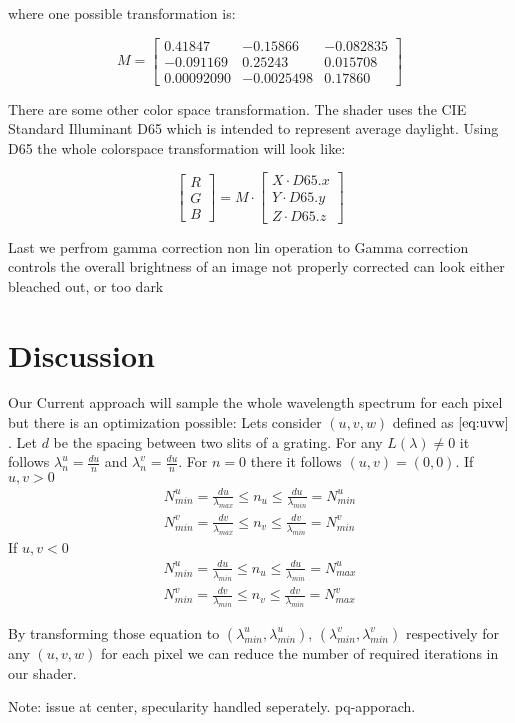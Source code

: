where one possible transformation is: 

\begin{equation}
M = \begin{bmatrix} 0.41847 & -0.15866 & -0.082835\\ -0.091169 & 0.25243 & 0.015708\\ 0.00092090 & -0.0025498 & 0.17860 \end{bmatrix}
\end{equation}

There are some other color space transformation. The shader uses the CIE Standard Illuminant D65 which is intended to represent average daylight. Using D65 the whole colorspace transformation will look like:

\begin{equation}
\begin{bmatrix}R\\G\\B\end{bmatrix} = M \cdot \begin{bmatrix}X \cdot D65.x \\ Y \cdot D65.y \\Z \cdot D65.z \end{bmatrix} 
\end{equation}

Last we perfrom gamma correction
non lin operation to 
Gamma correction controls the overall brightness of an image
not properly corrected can look either bleached out, or too dark

\section{Discussion}
Our Current approach will sample the whole wavelength spectrum for each pixel but there is an optimization possible:
Lets consider $(u,v,w)$ defined as $\ref{eq:uvw}$. Let $d$ be the spacing between two slits of a grating. For any $L(\lambda) \neq 0$ it follows $\lambda_{n}^{u} = \frac{d u}{n}$ and $\lambda_{n}^{v} = \frac{d u}{n}$. For $n = 0$ there it follows $(u,v)=(0,0)$. 
If $u,v > 0$
\begin{align*}
    N_{min}^{u} = \frac{d u}{\lambda_{max}} \leq n_{u} \leq \frac{d u}{\lambda_{min}} = N_{min}^{u}\\
    N_{min}^{v} = \frac{d v}{\lambda_{max}} \leq n_{v} \leq \frac{d v}{\lambda_{min}} = N_{min}^{v}
\end{align*}
If $u,v < 0$
\begin{align*}
    N_{min}^{u} = \frac{d u}{\lambda_{min}} \leq n_{u} \leq \frac{d u}{\lambda_{min}} = N_{max}^{u}\\
    N_{min}^{v} = \frac{d v}{\lambda_{min}} \leq n_{v} \leq \frac{d v}{\lambda_{min}} = N_{max}^{v}
\end{align*}

By transforming those equation to $(\lambda_{min}^{u}, \lambda_{min}^{u})$, $(\lambda_{min}^{v}, \lambda_{min}^{v})$ respectively for any $(u,v,w)$ for each pixel we can reduce the number of required iterations in our shader.

Note: issue at center, specularity handled seperately.
pq-apporach.
